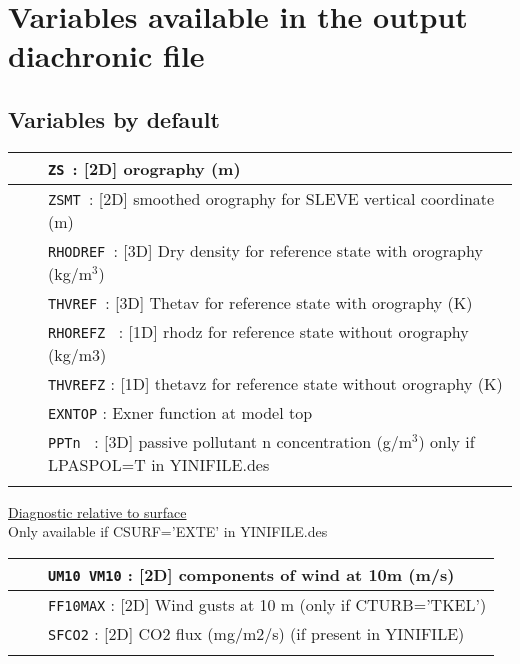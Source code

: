 \section{Variables available in the output diachronic file} \label{s:diag_list}

\subsection{Variables by default}
\begin{center}
\begin{tabular}{>{\centering}p{3cm}>{\centering}p{2.5cm}|p{11cm}|}
\cline{3-3}
&&{\tt ZS }: [2D] orography (m)  \\ \cline{3-3}
&&{\tt ZSMT }: [2D] smoothed orography for SLEVE vertical coordinate (m)  \\ \cline{3-3}
&&{\tt RHODREF }: [3D] Dry density for reference state with orography (kg/m$^3$)  \\ \cline{3-3}
&&{\tt THVREF }: [3D] Thetav for reference state with orography (K)  \\ \cline{3-3}
&&{\tt RHOREFZ } : [1D] rhodz for reference state without orography (kg/m3)  \\ \cline{3-3}
&&{\tt THVREFZ} : [1D] thetavz for reference state without orography (K) \\ \cline{3-3}
&&{\tt EXNTOP} :  Exner function at model top\\ \cline{3-3}
&&{\tt PPTn } : [3D] passive pollutant n concentration (g/m$^3$) only if LPASPOL=T in YINIFILE.des\\ \cline{3-3}
\end{tabular} 
\end{center}
\underline{Diagnostic relative to surface}\\
Only available if CSURF='EXTE' in YINIFILE.des
\begin{center}
\begin{tabular}{>{\centering}p{3cm}>{\centering}p{2.5cm}|p{11cm}|}
\cline{3-3}
&&{\tt UM10 VM10} : [2D] components of wind at 10m (m/s)\\\cline{3-3}
&&{\tt FF10MAX} : [2D] Wind gusts at 10 m (only if CTURB='TKEL')\\ \cline{3-3}
&&{\tt SFCO2} : [2D] CO2 flux (mg/m2/s) (if present in YINIFILE)\\ \cline{3-3}
\end{tabular} 
\end{center}
\newpage
